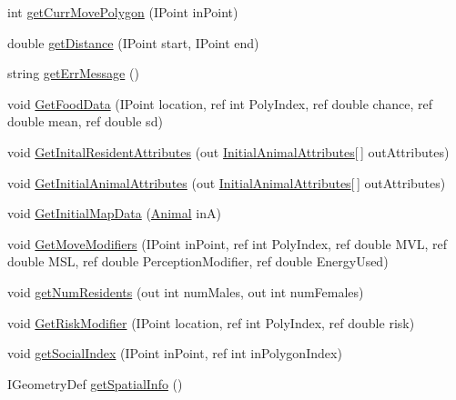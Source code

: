 \begin{DoxyCompactItemize}
\item 
int \hyperlink{class_s_e_a_r_c_h_1_1_map_manager_aaffa9b9b42618689929fafc42f4f9526}{get\-Curr\-Move\-Polygon} (I\-Point in\-Point)
\item 
double \hyperlink{class_s_e_a_r_c_h_1_1_map_manager_ae17d45dc72bd65519f1ebc7ce1447c73}{get\-Distance} (I\-Point start, I\-Point end)
\item 
string \hyperlink{class_s_e_a_r_c_h_1_1_map_manager_a10dc009daae1b089e4e8cef50074f0a3}{get\-Err\-Message} ()
\item 
void \hyperlink{class_s_e_a_r_c_h_1_1_map_manager_ab46a76a60ee1a25675f8bc487471e77b}{Get\-Food\-Data} (I\-Point location, ref int Poly\-Index, ref double chance, ref double mean, ref double sd)
\item 
void \hyperlink{class_s_e_a_r_c_h_1_1_map_manager_ac5d3ecfa45e6a640cb797948d6cc9ade}{Get\-Inital\-Resident\-Attributes} (out \hyperlink{class_s_e_a_r_c_h_1_1_initial_animal_attributes}{Initial\-Animal\-Attributes}\mbox{[}$\,$\mbox{]} out\-Attributes)
\item 
void \hyperlink{class_s_e_a_r_c_h_1_1_map_manager_a35594729da266552931ab85c87f4d210}{Get\-Initial\-Animal\-Attributes} (out \hyperlink{class_s_e_a_r_c_h_1_1_initial_animal_attributes}{Initial\-Animal\-Attributes}\mbox{[}$\,$\mbox{]} out\-Attributes)
\item 
void \hyperlink{class_s_e_a_r_c_h_1_1_map_manager_a9b8255cfb41969d9539b9de013c3d65d}{Get\-Initial\-Map\-Data} (\hyperlink{class_s_e_a_r_c_h_1_1_animal}{Animal} in\-A)
\item 
void \hyperlink{class_s_e_a_r_c_h_1_1_map_manager_aa15b883c3c51ffef469027bfb13bf335}{Get\-Move\-Modifiers} (I\-Point in\-Point, ref int Poly\-Index, ref double M\-V\-L, ref double M\-S\-L, ref double Perception\-Modifier, ref double Energy\-Used)
\item 
void \hyperlink{class_s_e_a_r_c_h_1_1_map_manager_a5f2f159ff3722a8e773618afa14484cd}{get\-Num\-Residents} (out int num\-Males, out int num\-Females)
\item 
void \hyperlink{class_s_e_a_r_c_h_1_1_map_manager_af2c9381151e327bbacf84c319868ff85}{Get\-Risk\-Modifier} (I\-Point location, ref int Poly\-Index, ref double risk)
\item 
void \hyperlink{class_s_e_a_r_c_h_1_1_map_manager_a5d3cbe1632ef39200c74f286c4902533}{get\-Social\-Index} (I\-Point in\-Point, ref int in\-Polygon\-Index)
\item 
I\-Geometry\-Def \hyperlink{class_s_e_a_r_c_h_1_1_map_manager_aa8ea6c24ba311c75dd22e7c9f03f0639}{get\-Spatial\-Info} ()

\end{DoxyCompactItemize}
